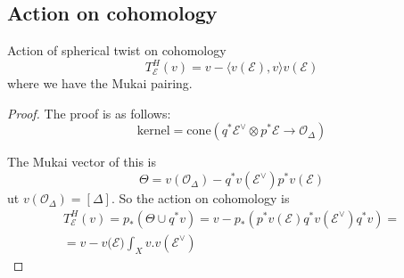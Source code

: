 \subsection{Action on cohomology}

\begin{proposition}{Action of spherical twist on cohomology}{}
    $$T_{\mathcal{E}}^H(v)=v-\langle v(\mathcal{E}),v\rangle v(\mathcal{E})$$
where we have the Mukai pairing.
\end{proposition}
 \begin{proof}
 The proof is as follows: 
 $$\text{kernel}=\mathrm{cone}(q^*\mathcal{E}^\lor\otimes p^* \mathcal{E}\xrightarrow{}\mathcal{O}_{\Delta})$$
 
 The Mukai vector of this is $$\Theta=v(\mathcal{O}_{\Delta})-q^*v(\mathcal{E}^\lor)p^*v(\mathcal{E})$$
 ut $v(\mathcal{O}_{\Delta})=[\Delta]$. So the action on cohomology is
\begin{gather*}
T_{\mathcal{E}}^H(v)=p_{*}(\Theta \cup q^*v)=v-p_{*}(p^*v(\mathcal{E})q^*v(\mathcal{E}^\lor)q^* v)=\\=v-v(\mathcal{E)}\int _{X} v.v(\mathcal{E}^\lor)
\end{gather*}

\end{proof}


